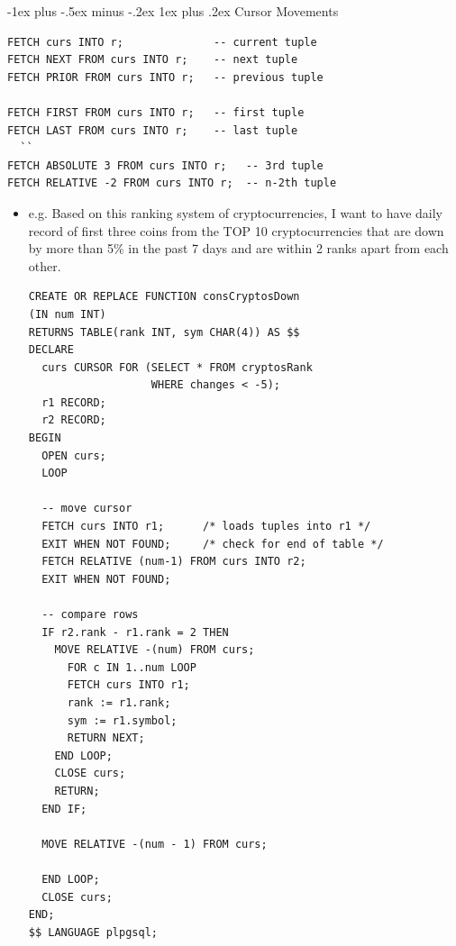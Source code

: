 \documentclass[10pt, landscape]{article}
\makeatletter
\renewcommand{\subsubsection}{\@startsection{subsubsection}{3}{0mm}%
  {-1ex plus -.5ex minus -.2ex}%
  {1ex plus .2ex}%
{\normalfont\small\bfseries}}%
\makeatother
\begin{document}
\begin{multicols}{3}
  \subsubsection{Cursor Movements}
  \begin{lstlisting}[style=mySQL]
FETCH curs INTO r;              -- current tuple
FETCH NEXT FROM curs INTO r;    -- next tuple
FETCH PRIOR FROM curs INTO r;   -- previous tuple

FETCH FIRST FROM curs INTO r;   -- first tuple
FETCH LAST FROM curs INTO r;    -- last tuple
  ``
FETCH ABSOLUTE 3 FROM curs INTO r;   -- 3rd tuple
FETCH RELATIVE -2 FROM curs INTO r;  -- n-2th tuple 

  \end{lstlisting}

  \begin{itemize}
    \item e.g. Based on this ranking system of cryptocurrencies, I want to have daily record of first three coins from the TOP 10 cryptocurrencies that are down by more than 5\% in the past 7 days and are within 2 ranks apart from each other.
      \begin{lstlisting}[style=mySQL]
CREATE OR REPLACE FUNCTION consCryptosDown
(IN num INT)
RETURNS TABLE(rank INT, sym CHAR(4)) AS $$
DECLARE
  curs CURSOR FOR (SELECT * FROM cryptosRank
                   WHERE changes < -5);
  r1 RECORD;
  r2 RECORD;
BEGIN
  OPEN curs;
  LOOP 

  -- move cursor
  FETCH curs INTO r1;      /* loads tuples into r1 */
  EXIT WHEN NOT FOUND;     /* check for end of table */
  FETCH RELATIVE (num-1) FROM curs INTO r2;
  EXIT WHEN NOT FOUND;

  -- compare rows
  IF r2.rank - r1.rank = 2 THEN
    MOVE RELATIVE -(num) FROM curs;
      FOR c IN 1..num LOOP
      FETCH curs INTO r1;
      rank := r1.rank;
      sym := r1.symbol;
      RETURN NEXT;
    END LOOP;
    CLOSE curs;
    RETURN;
  END IF;

  MOVE RELATIVE -(num - 1) FROM curs;

  END LOOP;
  CLOSE curs;
END;
$$ LANGUAGE plpgsql;
      \end{lstlisting}
  \end{itemize}


\end{multicols}
\end{document}
